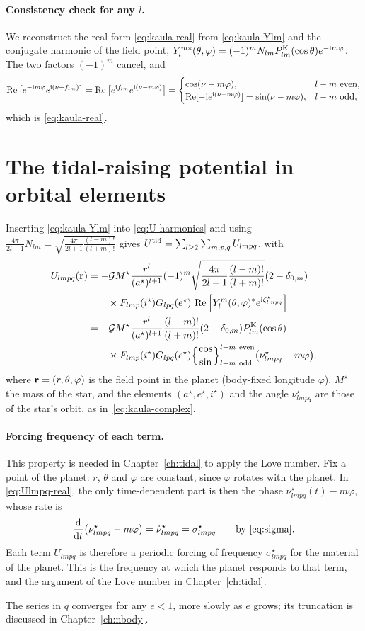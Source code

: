 \paragraph{Consistency check for any $l$.} We reconstruct the real form \eqref{eq:kaula-real} from \eqref{eq:kaula-Ylm} and the conjugate harmonic of the field point, $Y_l^{m*}(\theta,\varphi)=(-1)^mN_{lm}P^{\mathrm K}_{lm}(\cos\theta)e^{-\mathrm{i} m\varphi}$. The two factors $(-1)^m$ cancel, and
\[
  \Re\big[e^{-\I m\varphi}e^{\I(\nu+f_{lm})}\big]=\Re\big[e^{\I f_{lm}}e^{\I(\nu-m\varphi)}\big]=\begin{cases}\cos(\nu-m\varphi),&l-m\ \text{even},\\ \Re[-\I e^{\I(\nu-m\varphi)}]=\sin(\nu-m\varphi),&l-m\ \text{odd},\end{cases}
\]
which is \eqref{eq:kaula-real}.

\section{The tidal-raising potential in orbital elements}
Inserting \eqref{eq:kaula-Ylm} into \eqref{eq:U-harmonics} and using $\frac{4\pi}{2l+1}N_{lm}=\sqrt{\frac{4\pi}{2l+1}\frac{(l-m)!}{(l+m)!}}$ gives $U^{\rm tid}=\sum_{l\ge2}\sum_{m,p,q}U_{lmpq}$, with
\begin{align}
  U_{lmpq}(\vr)&=-\G M^\star\frac{r^l}{(a^\star)^{l+1}}(-1)^m\sqrt{\frac{4\pi}{2l+1}\frac{(l-m)!}{(l+m)!}}(2-\delta_{0,m})\notag\\
  &\qquad\times F_{lmp}(i^\star)G_{lpq}(e^\star)\,\Re\Big[Y_l^m(\theta,\varphi)^*e^{\I\zeta^\star_{lmpq}}\Big] \label{eq:Ulmpq-complex}\\
  &=-\G M^\star\frac{r^l}{(a^\star)^{l+1}}\frac{(l-m)!}{(l+m)!}(2-\delta_{0,m})\PK_{lm}(\cos\theta)\notag\\
  &\qquad\times F_{lmp}(i^\star)G_{lpq}(e^\star)\Big\{{\cos\atop\sin}\Big\}^{l-m\ \text{even}}_{l-m\ \text{odd}}\big(\nu^\star_{lmpq}-m\varphi\big). \label{eq:Ulmpq-real}
\end{align}
where $\mathbf r=(r,\theta,\varphi)$ is the field point in the planet (body-fixed longitude $\varphi$), $M^\star$ the mass of the star, and the elements $(a^\star,e^\star,i^\star)$ and the angle $\nu^\star_{lmpq}$ are those of the star's orbit, as in~\eqref{eq:kaula-complex}.

\paragraph{Forcing frequency of each term.} This property is needed in Chapter~\ref{ch:tidal} to apply the Love number. Fix a point of the planet: $r$, $\theta$ and $\varphi$ are constant, since $\varphi$ rotates with the planet. In \eqref{eq:Ulmpq-real}, the only time-dependent part is then the phase $\nu^\star_{lmpq}(t)-m\varphi$, whose rate is
\[
  \frac{\mathrm{d}}{\mathrm{d} t}\big(\nu^\star_{lmpq}-m\varphi\big)=\dot\nu^\star_{lmpq}=\sigma^\star_{lmpq}\qquad\text{by \eqref{eq:sigma}}.
\]
Each term $U_{lmpq}$ is therefore a periodic forcing of frequency $\sigma^\star_{lmpq}$ for the material of the planet. This is the frequency at which the planet responds to that term, and the argument of the Love number in Chapter~\ref{ch:tidal}.

The series in $q$ converges for any $e<1$, more slowly as $e$ grows; its truncation is discussed in Chapter~\ref{ch:nbody}.
